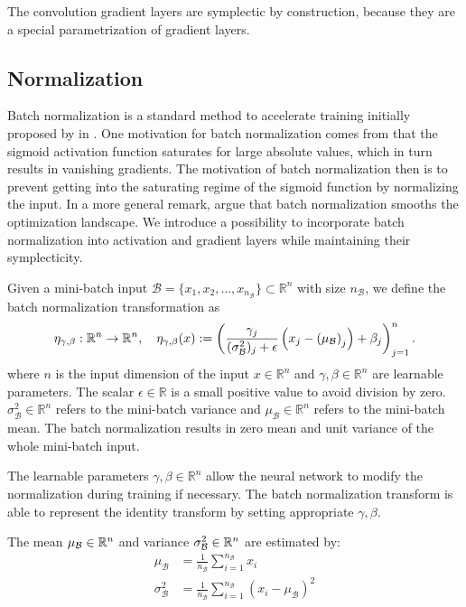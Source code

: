 \documentclass[twoside,a4paper]{article}
\begin{document}
The convolution gradient layers are symplectic by construction,
because they are a special parametrization of gradient layers.

\subsection{Normalization}

Batch normalization is a standard method to accelerate training initially proposed by
\citeauthor{batchnorm-ioffe15} in \cite{batchnorm-ioffe15}.
One motivation for batch normalization comes from that the sigmoid activation function saturates 
for large absolute values, which in turn results in vanishing gradients. The motivation of batch
normalization then is to prevent getting into the saturating regime of the sigmoid function
by normalizing the input. In a more general remark, \citet{Santurkar2018} argue that
batch normalization smooths the optimization landscape.
We introduce a possibility to incorporate batch normalization
into activation and gradient layers while maintaining their symplecticity.

Given a mini-batch input $\mathcal{B} = \{  x_1, x_2, \dots, x_{n_{\mathcal{B}}} \} \subset \mathbb{R}^{n}$ 
with size $n_{\mathcal{B}}$, we define the batch normalization transformation as
\begin{equation*}
	\eta_{\gamma, \beta} : \mathbb{R}^n \to \mathbb{R}^n,\quad
	\eta_{\gamma, \beta}(x) 
	:= \left( \frac{\gamma_j}{(\sigma^2_\mathcal{B})_j + \epsilon} 
	\left( x_j - \left( \mu_\mathcal{B} \right)_j \right) + \beta_j \right)_{j=1}^n
	.
\end{equation*}
where $n$ is the input dimension of the input $x \in \mathbb{R}^n$ and $\gamma, \beta \in \mathbb{R}^{n}$ 
are learnable parameters.
The scalar $\epsilon \in \mathbb{R}$ is a small positive value to avoid division by zero.
$\sigma^2_\mathcal{B} \in \mathbb{R}^{n}$ refers to the mini-batch variance and
$\mu_\mathcal{B} \in \mathbb{R}^{n}$ refers to the mini-batch mean. The batch normalization results 
in zero mean and unit variance of the whole mini-batch input.

The learnable parameters $\gamma, \beta \in \mathbb{R}^{n}$ allow the neural network to modify
the normalization during training if necessary. The batch normalization transform is able to 
represent the identity transform by setting appropriate $\gamma, \beta$.

The mean $\mu_\mathcal{B} \in \mathbb{R}^n$ and variance $\sigma^2_\mathcal{B} \in \mathbb{R}^n$ are estimated by:
\begin{align*}
	\mu_\mathcal{B} &= \frac{1}{n_{\mathcal{B}}} \sum_{i=1}^{n_{\mathcal{B}}} x_i \\
	\sigma^2_\mathcal{B} &= \frac{1}{n_{\mathcal{B}}} 
	\sum_{i=1}^{n_{\mathcal{B}}} (x_i - \mu_\mathcal{B})^2
\end{align*}
\end{document}
